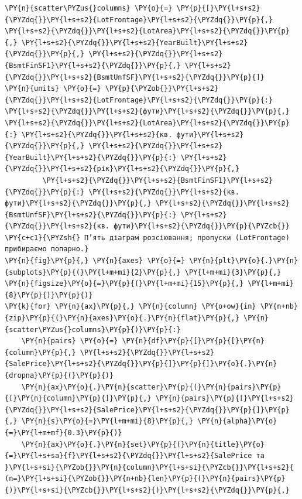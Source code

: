 \begin{Verbatim}[commandchars=\\\{\}]
\PY{n}{scatter\PYZus{}columns} \PY{o}{=} \PY{p}{[}\PY{l+s+s2}{\PYZdq{}}\PY{l+s+s2}{LotFrontage}\PY{l+s+s2}{\PYZdq{}}\PY{p}{,} \PY{l+s+s2}{\PYZdq{}}\PY{l+s+s2}{LotArea}\PY{l+s+s2}{\PYZdq{}}\PY{p}{,} \PY{l+s+s2}{\PYZdq{}}\PY{l+s+s2}{YearBuilt}\PY{l+s+s2}{\PYZdq{}}\PY{p}{,} \PY{l+s+s2}{\PYZdq{}}\PY{l+s+s2}{BsmtFinSF1}\PY{l+s+s2}{\PYZdq{}}\PY{p}{,} \PY{l+s+s2}{\PYZdq{}}\PY{l+s+s2}{BsmtUnfSF}\PY{l+s+s2}{\PYZdq{}}\PY{p}{]}
\PY{n}{units} \PY{o}{=} \PY{p}{\PYZob{}}\PY{l+s+s2}{\PYZdq{}}\PY{l+s+s2}{LotFrontage}\PY{l+s+s2}{\PYZdq{}}\PY{p}{:} \PY{l+s+s2}{\PYZdq{}}\PY{l+s+s2}{фути}\PY{l+s+s2}{\PYZdq{}}\PY{p}{,} \PY{l+s+s2}{\PYZdq{}}\PY{l+s+s2}{LotArea}\PY{l+s+s2}{\PYZdq{}}\PY{p}{:} \PY{l+s+s2}{\PYZdq{}}\PY{l+s+s2}{кв. фути}\PY{l+s+s2}{\PYZdq{}}\PY{p}{,} \PY{l+s+s2}{\PYZdq{}}\PY{l+s+s2}{YearBuilt}\PY{l+s+s2}{\PYZdq{}}\PY{p}{:} \PY{l+s+s2}{\PYZdq{}}\PY{l+s+s2}{рік}\PY{l+s+s2}{\PYZdq{}}\PY{p}{,}
         \PY{l+s+s2}{\PYZdq{}}\PY{l+s+s2}{BsmtFinSF1}\PY{l+s+s2}{\PYZdq{}}\PY{p}{:} \PY{l+s+s2}{\PYZdq{}}\PY{l+s+s2}{кв. фути}\PY{l+s+s2}{\PYZdq{}}\PY{p}{,} \PY{l+s+s2}{\PYZdq{}}\PY{l+s+s2}{BsmtUnfSF}\PY{l+s+s2}{\PYZdq{}}\PY{p}{:} \PY{l+s+s2}{\PYZdq{}}\PY{l+s+s2}{кв. фути}\PY{l+s+s2}{\PYZdq{}}\PY{p}{\PYZcb{}}
\PY{c+c1}{\PYZsh{} П’ять діаграм розсіювання; пропуски (LotFrontage) прибираємо попарно.}
\PY{n}{fig}\PY{p}{,} \PY{n}{axes} \PY{o}{=} \PY{n}{plt}\PY{o}{.}\PY{n}{subplots}\PY{p}{(}\PY{l+m+mi}{2}\PY{p}{,} \PY{l+m+mi}{3}\PY{p}{,} \PY{n}{figsize}\PY{o}{=}\PY{p}{(}\PY{l+m+mi}{15}\PY{p}{,} \PY{l+m+mi}{8}\PY{p}{)}\PY{p}{)}
\PY{k}{for} \PY{n}{ax}\PY{p}{,} \PY{n}{column} \PY{o+ow}{in} \PY{n+nb}{zip}\PY{p}{(}\PY{n}{axes}\PY{o}{.}\PY{n}{flat}\PY{p}{,} \PY{n}{scatter\PYZus{}columns}\PY{p}{)}\PY{p}{:}
    \PY{n}{pairs} \PY{o}{=} \PY{n}{df}\PY{p}{[}\PY{p}{[}\PY{n}{column}\PY{p}{,} \PY{l+s+s2}{\PYZdq{}}\PY{l+s+s2}{SalePrice}\PY{l+s+s2}{\PYZdq{}}\PY{p}{]}\PY{p}{]}\PY{o}{.}\PY{n}{dropna}\PY{p}{(}\PY{p}{)}
    \PY{n}{ax}\PY{o}{.}\PY{n}{scatter}\PY{p}{(}\PY{n}{pairs}\PY{p}{[}\PY{n}{column}\PY{p}{]}\PY{p}{,} \PY{n}{pairs}\PY{p}{[}\PY{l+s+s2}{\PYZdq{}}\PY{l+s+s2}{SalePrice}\PY{l+s+s2}{\PYZdq{}}\PY{p}{]}\PY{p}{,} \PY{n}{s}\PY{o}{=}\PY{l+m+mi}{8}\PY{p}{,} \PY{n}{alpha}\PY{o}{=}\PY{l+m+mf}{0.3}\PY{p}{)}
    \PY{n}{ax}\PY{o}{.}\PY{n}{set}\PY{p}{(}\PY{n}{title}\PY{o}{=}\PY{l+s+sa}{f}\PY{l+s+s2}{\PYZdq{}}\PY{l+s+s2}{SalePrice та }\PY{l+s+si}{\PYZob{}}\PY{n}{column}\PY{l+s+si}{\PYZcb{}}\PY{l+s+s2}{ (n=}\PY{l+s+si}{\PYZob{}}\PY{n+nb}{len}\PY{p}{(}\PY{n}{pairs}\PY{p}{)}\PY{l+s+si}{\PYZcb{}}\PY{l+s+s2}{)}\PY{l+s+s2}{\PYZdq{}}\PY{p}{,}

\end{Verbatim}
